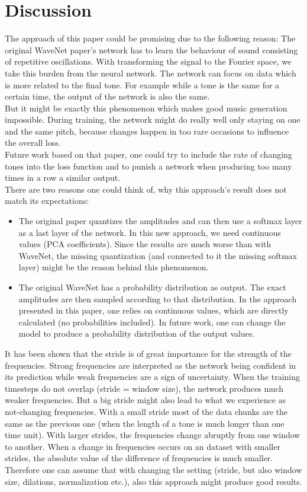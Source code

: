 \documentclass[10pt,conference,compsocconf]{IEEEtran}
\begin{document}
\section{Discussion}
The approach of this paper could be promising due to the following reason: The original WaveNet paper's network has to learn the behaviour of sound consisting of repetitive oscillations. With transforming the signal to the Fourier space, we take this burden from the neural network. The network can focus on data which is more related to the final tone. For example while a tone is the same for a certain time, the output of the network is also the same.\\
But it might be exactly this phenomenon which makes good music generation impossible. During training, the network might do really well only staying on one and the same pitch, because changes happen in too rare occasions to influence the overall loss.\\
Future work based on that paper, one could try to include the rate of changing tones into the loss function and to punish a network when producing too many times in a row a similar output.\\
There are two reasons one could think of, why this approach's result does not match its expectations:
\begin{itemize}
  \item The original paper quantizes the amplitudes and can then use a softmax layer as a last layer of the network. In this new approach, we need continuous values (PCA coefficients). Since the results are much worse than with WaveNet, the missing quantization (and connected to it the missing softmax layer) might be the reason behind this phenomenon.
  \item The original WaveNet has a probability distribution as output. The exact amplitudes are then sampled according to that distribution. In the approach presented in this paper, one relies on continuous values, which are directly calculated (no probabilities included). In future work, one can change the model to produce a probability distribution of the output values.
\end{itemize}

It has been shown that the stride is of great importance for the strength of the frequencies. Strong frequencies are interpreted as the network being confident in its prediction while weak frequencies are a sign of uncertainty. When the training timesteps do not overlap (stride = window size), the network produces much weaker frequencies. But a big stride might also lead to what we experience as not-changing frequencies. With a small stride most of the data chunks are the same as the previous one (when the length of a tone is much longer than one time unit). With larger strides, the frequencies change abruptly from one window to another. When a change in frequencies occurs on an dataset with smaller strides, the absolute value of the difference of frequencies is much smaller.\\
Therefore one can assume that with changing the setting (stride, but also window size, dilations, normalization etc.), also this approach might produce good results.
\end{document}
